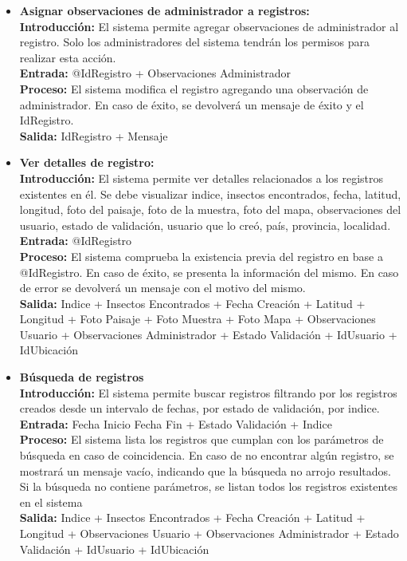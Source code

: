 \begin{enumerate}[A.]
\begin{itemize}
          \item \textbf{Asignar observaciones de administrador a registros:}
            \\ \textbf{Introducción:} El sistema permite agregar observaciones de administrador al registro. Solo los administradores del sistema tendrán los permisos para realizar esta acción.
            \\ \textbf{Entrada:} @IdRegistro + Observaciones Administrador
            \\ \textbf{Proceso:} El sistema modifica el registro agregando una observación de administrador. En caso de éxito, se devolverá un mensaje de éxito y el IdRegistro.
            \\ \textbf{Salida:} IdRegistro + Mensaje
            \\
          \item \textbf{Ver detalles de registro:}
            \\ \textbf{Introducción:} El sistema permite ver detalles relacionados a los registros existentes en él. Se debe visualizar indice, insectos encontrados, fecha, latitud, longitud, foto del paisaje, foto de la muestra, foto del mapa, observaciones del usuario, estado de validación, usuario que lo creó, país, provincia, localidad.
            \\ \textbf{Entrada:} @IdRegistro
            \\ \textbf{Proceso:} El sistema comprueba la existencia previa del registro en base a @IdRegistro. En caso de éxito, se presenta la información del mismo. En caso de error se devolverá un mensaje con el motivo del mismo.
            \\ \textbf{Salida:} Indice + Insectos Encontrados + Fecha Creación + Latitud + Longitud + Foto Paisaje + Foto Muestra + Foto Mapa + Observaciones Usuario + Observaciones Administrador + Estado Validación + IdUsuario + IdUbicación
            \\
          \item \textbf{Búsqueda de registros}
            \\ \textbf{Introducción:} El sistema permite buscar registros filtrando por los registros creados desde un intervalo de fechas, por estado de validación, por indice.
            \\ \textbf{Entrada:} Fecha Inicio Fecha Fin + Estado Validación + Indice
            \\ \textbf{Proceso:} El sistema lista los registros que cumplan con los parámetros de búsqueda en caso de coincidencia. En caso de no encontrar algún registro, se mostrará un mensaje vacío, indicando que la búsqueda no arrojo resultados. Si la búsqueda no contiene parámetros, se listan todos los registros existentes en el sistema
            \\ \textbf{Salida:} Indice + Insectos Encontrados + Fecha Creación + Latitud + Longitud + Observaciones Usuario + Observaciones Administrador + Estado Validación + IdUsuario + IdUbicación
        \end{itemize}


\end{enumerate}

